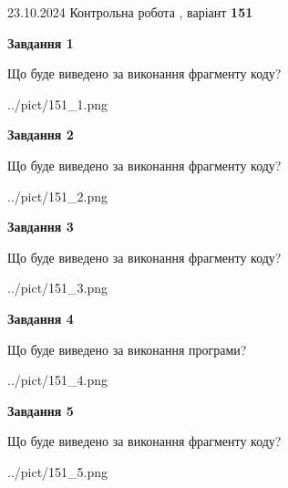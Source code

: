 \documentclass[12pt, ukrainian]{article}
\begin{document}
{\Large{23.10.2024 Контрольна робота , варіант  \No \textbf { 151 }\par}}
{
\begin {large}
{\begin {center}\textbf{Завдання 1}\end {center}}

Що буде виведено за виконання фрагменту коду?\par
\begin{center}
	{../pict/151_1.png}
\end{center}
\newpage

{\begin {center}\textbf{Завдання 2}\end {center}}

Що буде виведено за виконання фрагменту коду?\par
\begin{center}
	{../pict/151_2.png}
\end{center}
\newpage

{\begin {center}\textbf{Завдання 3}\end {center}}

Що буде виведено за виконання фрагменту коду?\par
\begin{center}
	{../pict/151_3.png}
\end{center}
\newpage

{\begin {center}\textbf{Завдання 4}\end {center}}

Що буде виведено за виконання програми?\par
\begin{center}
	{../pict/151_4.png}
\end{center}
\newpage

{\begin {center}\textbf{Завдання 5}\end {center}}

Що буде виведено за виконання фрагменту коду?\par
\begin{center}
	{../pict/151_5.png}
\end{center}
\newpage


\end{large}}
\end{document}
